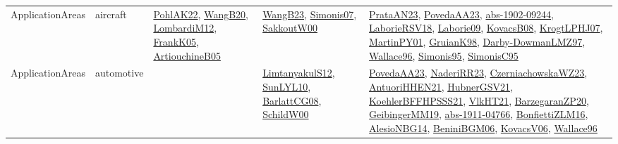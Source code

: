 {\begin{longtable}{lp{3cm}>{\raggedright}p{6cm}>{\raggedright}p{6cm}p{8cm}}
ApplicationAreas & aircraft & \href{articles/PohlAK22.pdf}{PohlAK22}\cite{PohlAK22}, \href{papers/WangB20.pdf}{WangB20}\cite{WangB20}, \href{articles/LombardiM12.pdf}{LombardiM12}\cite{LombardiM12}, \href{papers/FrankK05.pdf}{FrankK05}\cite{FrankK05}, \href{papers/ArtiouchineB05.pdf}{ArtiouchineB05}\cite{ArtiouchineB05} & \href{papers/WangB23.pdf}{WangB23}\cite{WangB23}, \href{articles/Simonis07.pdf}{Simonis07}\cite{Simonis07}, \href{articles/SakkoutW00.pdf}{SakkoutW00}\cite{SakkoutW00} & \href{articles/PrataAN23.pdf}{PrataAN23}\cite{PrataAN23}, \href{papers/PovedaAA23.pdf}{PovedaAA23}\cite{PovedaAA23}, \href{articles/abs-1902-09244.pdf}{abs-1902-09244}\cite{abs-1902-09244}, \href{articles/LaborieRSV18.pdf}{LaborieRSV18}\cite{LaborieRSV18}, \href{papers/Laborie09.pdf}{Laborie09}\cite{Laborie09}, \href{articles/KovacsB08.pdf}{KovacsB08}\cite{KovacsB08}, \href{papers/KrogtLPHJ07.pdf}{KrogtLPHJ07}\cite{KrogtLPHJ07}, \href{articles/MartinPY01.pdf}{MartinPY01}\cite{MartinPY01}, \href{papers/GruianK98.pdf}{GruianK98}\cite{GruianK98}, \href{articles/Darby-DowmanLMZ97.pdf}{Darby-DowmanLMZ97}\cite{Darby-DowmanLMZ97}, \href{articles/Wallace96.pdf}{Wallace96}\cite{Wallace96}, \href{papers/Simonis95.pdf}{Simonis95}\cite{Simonis95}, \href{papers/SimonisC95.pdf}{SimonisC95}\cite{SimonisC95}\\
ApplicationAreas & automotive &  & \href{articles/LimtanyakulS12.pdf}{LimtanyakulS12}\cite{LimtanyakulS12}, \href{papers/SunLYL10.pdf}{SunLYL10}\cite{SunLYL10}, \href{papers/BarlattCG08.pdf}{BarlattCG08}\cite{BarlattCG08}, \href{articles/SchildW00.pdf}{SchildW00}\cite{SchildW00} & \href{papers/PovedaAA23.pdf}{PovedaAA23}\cite{PovedaAA23}, \href{articles/NaderiRR23.pdf}{NaderiRR23}\cite{NaderiRR23}, \href{articles/CzerniachowskaWZ23.pdf}{CzerniachowskaWZ23}\cite{CzerniachowskaWZ23}, \href{papers/AntuoriHHEN21.pdf}{AntuoriHHEN21}\cite{AntuoriHHEN21}, \href{articles/HubnerGSV21.pdf}{HubnerGSV21}\cite{HubnerGSV21}, \href{articles/KoehlerBFFHPSSS21.pdf}{KoehlerBFFHPSSS21}\cite{KoehlerBFFHPSSS21}, \href{articles/VlkHT21.pdf}{VlkHT21}\cite{VlkHT21}, \href{papers/BarzegaranZP20.pdf}{BarzegaranZP20}\cite{BarzegaranZP20}, \href{papers/GeibingerMM19.pdf}{GeibingerMM19}\cite{GeibingerMM19}, \href{articles/abs-1911-04766.pdf}{abs-1911-04766}\cite{abs-1911-04766}, \href{papers/BonfiettiZLM16.pdf}{BonfiettiZLM16}\cite{BonfiettiZLM16}, \href{papers/AlesioNBG14.pdf}{AlesioNBG14}\cite{AlesioNBG14}, \href{papers/BeniniBGM06.pdf}{BeniniBGM06}\cite{BeniniBGM06}, \href{papers/KovacsV06.pdf}{KovacsV06}\cite{KovacsV06}, \href{articles/Wallace96.pdf}{Wallace96}\cite{Wallace96}\\

\end{longtable}}
